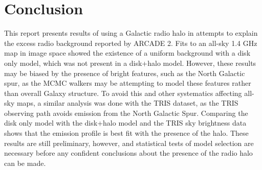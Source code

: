 \documentclass[%
onecolumn,
11pt,
tightenlines,
notitlepage,
superscriptaddress,
nofootinbib,
amsmath,amssymb,
aps,
pra,
]{revtex4-1}
\begin{document}
\section{Conclusion}
This report presents results of using a Galactic radio halo in attempts to explain the excess radio background reported by ARCADE 2. Fits to an all-sky 1.4 GHz map in image space showed the existence of a uniform background with a disk only model, which was not present in a disk+halo model. However, these results may be biased by the presence of bright features, such as the North Galactic spur, as the MCMC walkers may be attempting to model these features rather than overall Galaxy structure. To avoid this and other systematics affecting all-sky maps, a similar analysis was done with the TRIS dataset, as the TRIS observing path avoids emission from the North Galactic Spur. Comparing the disk only model with the disk+halo model and the TRIS sky brightness data shows that the emission profile is best fit with the presence of the halo. These results are still preliminary, however, and statistical tests of model selection are necessary before any confident conclusions about the presence of the radio halo can be made.




\end{document}
